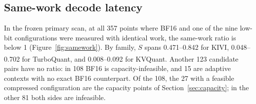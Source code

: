 \documentclass{article}
\newcommand{\ported}{\textsuperscript{\textdagger}}
\begin{document}
\subsection{Same-work decode latency}
\label{sec:latency}

In the frozen primary scan, at all 357 points where BF16 and one of the nine low-bit configurations were measured with identical work, the same-work ratio is below 1 (Figure~\ref{fig:samework}).
By family, $S$ spans 0.471--0.842 for KIVI, 0.048--0.702 for TurboQuant\ported, and 0.008--0.092 for KVQuant.
Another 123 candidate pairs have no ratio: in 108 BF16 is capacity-infeasible, and 15 are adaptive contexts with no exact BF16 counterpart.
Of the 108, the 27 with a feasible compressed configuration are the capacity points of Section~\ref{sec:capacity}; in the other 81 both sides are infeasible.
\end{document}
